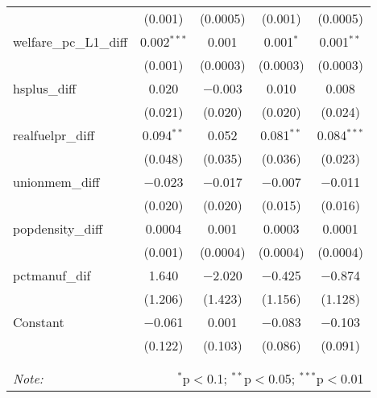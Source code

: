 \begin{table}[!htbp]
\begin{tabular}{@{\extracolsep{5pt}}lcccc}
  & (0.001) & (0.0005) & (0.001) & (0.0005) \\ 
  welfare\_pc\_L1\_diff & 0.002$^{***}$ & 0.001 & 0.001$^{*}$ & 0.001$^{**}$ \\ 
  & (0.001) & (0.0003) & (0.0003) & (0.0003) \\ 
  hsplus\_diff & 0.020 & $-$0.003 & 0.010 & 0.008 \\ 
  & (0.021) & (0.020) & (0.020) & (0.024) \\ 
  realfuelpr\_diff & 0.094$^{**}$ & 0.052 & 0.081$^{**}$ & 0.084$^{***}$ \\ 
  & (0.048) & (0.035) & (0.036) & (0.023) \\ 
  unionmem\_diff & $-$0.023 & $-$0.017 & $-$0.007 & $-$0.011 \\ 
  & (0.020) & (0.020) & (0.015) & (0.016) \\ 
  popdensity\_diff & 0.0004 & 0.001 & 0.0003 & 0.0001 \\ 
  & (0.001) & (0.0004) & (0.0004) & (0.0004) \\ 
  pctmanuf\_dif & 1.640 & $-$2.020 & $-$0.425 & $-$0.874 \\ 
  & (1.206) & (1.423) & (1.156) & (1.128) \\ 
  Constant & $-$0.061 & 0.001 & $-$0.083 & $-$0.103 \\ 
  & (0.122) & (0.103) & (0.086) & (0.091) \\ 
 \hline \\[-1.8ex] 
\hline 
\hline \\[-1.8ex] 
\textit{Note:}  & \multicolumn{4}{r}{$^{*}$p$<$0.1; $^{**}$p$<$0.05; $^{***}$p$<$0.01} \\ 
\end{tabular} 
\end{table} 
